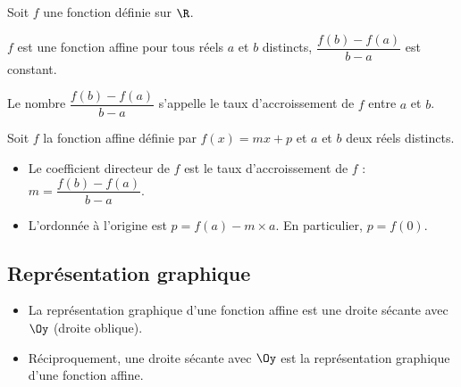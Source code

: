 %
%
%
\begin{prp} Soit $f$ une fonction définie sur $\R$. 

$f$ est une fonction affine \ssi pour tous réels $a$ et $b$ distincts, $\dfrac{f(b)-f(a)}{b-a}$ est constant.
\end{prp}
%
%
%
Le nombre $\dfrac{f(b)-f(a)}{b-a}$ s'appelle le taux d'accroissement de $f$ entre $a$ et $b$.
%
%
%
\begin{prp}
Soit $f$ la fonction affine définie par $f(x)=mx+p$ et $a$ et $b$ deux réels distincts.
\begin{itemize}
\item Le coefficient directeur de $f$ est le taux d'accroissement de $f$ : $m=\dfrac{f(b)-f(a)}{b-a}$.
\item L'ordonnée à l'origine est $p=f(a)-m\times a$. En particulier, $p=f(0)$.
\end{itemize}
\end{prp}
%
%
\subsection{Représentation graphique}
%
%
\begin{prp}
\begin{itemize}
\item La représentation graphique d'une fonction affine est une droite sécante avec $\Oy$ (droite \og{}oblique\fg{}).
\item Réciproquement, une droite sécante avec $\Oy$ est la représentation graphique d'une fonction affine.
\end{itemize}
\end{prp}

